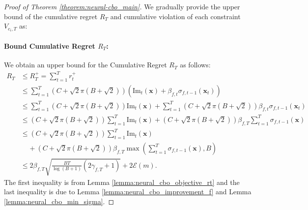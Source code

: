 \begin{proof} [Proof of Theorem \ref{theorem:neural-cbo_main}]

We gradually provide the upper bound of the cumulative regret $R_T$ and cumulative violation of each constraint $V_{c_i,T}$ as: 
\paragraph{Bound Cumulative Regret $R_{T}$:}

\noindent We obtain an upper bound for the Cumulative Regret $R_T$ as follows:
\begin{align*}
    R_T & \le R_T^+ = \sum_{t=1}^T r_t^+
    \\
    & \le \sum_{t=1}^T \left(C + \sqrt{2}\pi(B + \sqrt{2}) \right)\left(\text{Im}_t (\mathbf{x})+ \beta_{f,t} \sigma_{f,t-1}(\mathbf{x}_t) \right)
    \\
    & \le \sum_{t=1}^T \left(C + \sqrt{2}\pi(B + \sqrt{2}) \right) \text{Im}_t (\mathbf{x}) +  \sum_{t=1}^T  \left(C + \sqrt{2}\pi(B + \sqrt{2}) \right) \beta_{f,t} \sigma_{f,t-1}(\mathbf{x}_t) 
    \\
    & \le \left(C + \sqrt{2}\pi(B + \sqrt{2}) \right) \sum_{t=1}^T \text{Im}_t (\mathbf{x}) +  \left(C + \sqrt{2}\pi(B + \sqrt{2}) \right) \beta_{f,T} \sum_{t=1}^T \sigma_{f,t-1}(\mathbf{x})
    \\
    & \le \left(C + \sqrt{2}\pi(B + \sqrt{2}) \right) \sum_{t=1}^T \text{Im}_t (\mathbf{x}) \\
    & \;\;\;\; +  \left(C + \sqrt{2}\pi(B + \sqrt{2}) \right) \beta_{f,T} \max \left(\sum_{t=1}^T \sigma_{f,t-1}(\mathbf{x}), B \right) 
    \\
    & \le 2 \beta_{f,T} \sqrt{\frac{B T}{\log(B+1)} (2\gamma_{f,T}+1)} + 2 \mathcal{E}(m).
\end{align*}
The first inequality is from Lemma \ref{lemma:neural_cbo_objective_rt} and the last inequality is due to Lemma \ref{lemma:neural_cbo_improvement_f} and Lemma \ref{lemma:neural_cbo_min_sigma}. 

\end{proof}
